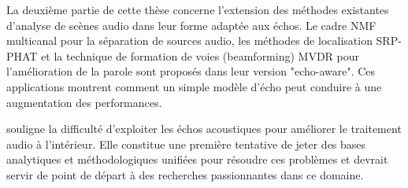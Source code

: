     \mynewline
    La deuxième partie de cette thèse concerne l'extension des méthodes existantes d'analyse de scènes audio dans leur forme adaptée aux échos.
    Le cadre NMF multicanal pour la séparation de sources audio, les méthodes de localisation SRP-PHAT et la technique de formation de voies (beamforming) MVDR pour l'amélioration de la parole
    sont proposés dans leur version "echo-aware". Ces applications montrent comment un simple modèle d'écho peut conduire à une augmentation des performances.

     souligne la difficulté d'exploiter les échos acoustiques pour améliorer le traitement audio à l'intérieur.
    Elle constitue une première tentative de jeter des bases analytiques et méthodologiques unifiées pour résoudre ces problèmes et devrait servir de point de départ à des recherches passionnantes dans ce domaine.